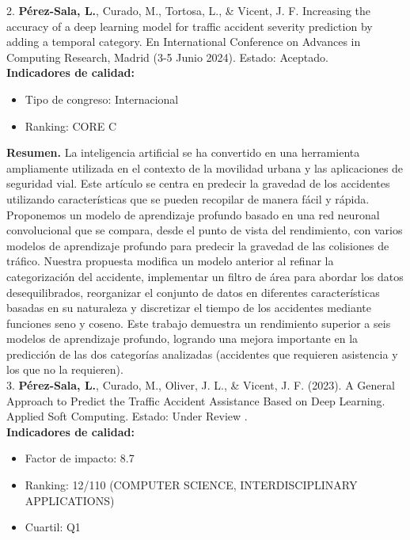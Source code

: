 2. \textbf{Pérez-Sala, L.}, Curado, M., Tortosa, L., \& Vicent, J. F. Increasing the accuracy of a deep learning model for traffic accident severity prediction by adding a temporal category. En International Conference on Advances in Computing Research, Madrid (3-5 Junio 2024). Estado: Aceptado.\\

\textbf{Indicadores de calidad:} 
\begin{itemize}
	\item Tipo de congreso: Internacional
	\item Ranking: CORE C
\end{itemize}

\textbf{Resumen.} La inteligencia artificial se ha convertido en una herramienta ampliamente utilizada en el contexto de la movilidad urbana y las aplicaciones de seguridad vial. Este artículo se centra en predecir la gravedad de los accidentes utilizando características que se pueden recopilar de manera fácil y rápida. Proponemos un modelo de aprendizaje profundo basado en una red neuronal convolucional que se compara, desde el punto de vista del rendimiento, con varios modelos de aprendizaje profundo para predecir la gravedad de las colisiones de tráfico. Nuestra propuesta modifica un modelo anterior al refinar la categorización del accidente, implementar un filtro de área para abordar los datos desequilibrados, reorganizar el conjunto de datos en diferentes características basadas en su naturaleza y discretizar el tiempo de los accidentes mediante funciones seno y coseno. Este trabajo demuestra un rendimiento superior a seis modelos de aprendizaje profundo, logrando una mejora importante en la predicción de las dos categorías analizadas (accidentes que requieren asistencia y los que no la requieren). \\


3. \textbf{Pérez-Sala, L.}, Curado, M., Oliver, J. L., \& Vicent, J. F. (2023). A General Approach to Predict the Traffic Accident Assistance Based on Deep Learning. Applied Soft Computing. Estado: Under Review .\\

\textbf{Indicadores de calidad:} 
\begin{itemize}
	\item Factor de impacto: 8.7
	\item Ranking: 12/110 (COMPUTER SCIENCE, INTERDISCIPLINARY APPLICATIONS)
	
	\item Cuartil: Q1
\end{itemize}

